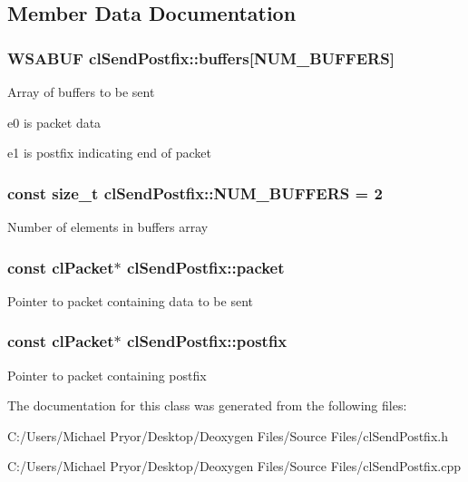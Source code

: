 \subsection{Member Data Documentation}
\hypertarget{classcl_send_postfix_a8de5162b564e5a62ee4e78cd70413ce7}{
\subsubsection[{buffers}]{\setlength{\rightskip}{0pt plus 5cm}WSABUF {\bf clSendPostfix::buffers}\mbox{[}{\bf NUM\_\-BUFFERS}\mbox{]}}}
\label{classcl_send_postfix_a8de5162b564e5a62ee4e78cd70413ce7}
Array of buffers to be sent
\begin{DoxyItemize}
\item e0 is packet data
\item e1 is postfix indicating end of packet 
\end{DoxyItemize}\hypertarget{classcl_send_postfix_a1243748bf3f0d732da1e59eed42068a1}{
\subsubsection[{NUM\_\-BUFFERS}]{\setlength{\rightskip}{0pt plus 5cm}const size\_\-t {\bf clSendPostfix::NUM\_\-BUFFERS} = 2}}
\label{classcl_send_postfix_a1243748bf3f0d732da1e59eed42068a1}
Number of elements in buffers array \hypertarget{classcl_send_postfix_a372780fa26eea19e710c6341f5633488}{
\subsubsection[{packet}]{\setlength{\rightskip}{0pt plus 5cm}const {\bf clPacket}$\ast$ {\bf clSendPostfix::packet}}}
\label{classcl_send_postfix_a372780fa26eea19e710c6341f5633488}
Pointer to packet containing data to be sent \hypertarget{classcl_send_postfix_accd15979eb11bf7e39b588537eb8e1b5}{
\subsubsection[{postfix}]{\setlength{\rightskip}{0pt plus 5cm}const {\bf clPacket}$\ast$ {\bf clSendPostfix::postfix}}}
\label{classcl_send_postfix_accd15979eb11bf7e39b588537eb8e1b5}
Pointer to packet containing postfix 

The documentation for this class was generated from the following files:\begin{DoxyCompactItemize}
\item 
C:/Users/Michael Pryor/Desktop/Deoxygen Files/Source Files/clSendPostfix.h\item 
C:/Users/Michael Pryor/Desktop/Deoxygen Files/Source Files/clSendPostfix.cpp\end{DoxyCompactItemize}
